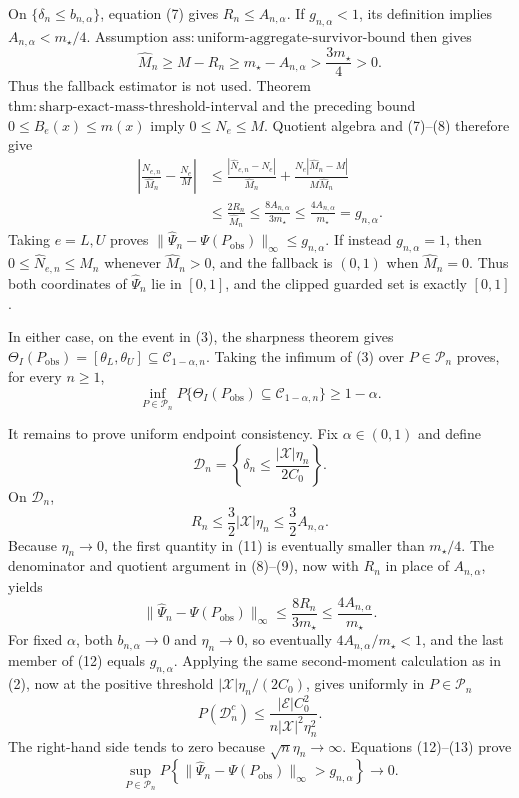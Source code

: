 On \(\{\delta_n\le b_{n,\alpha}\}\), equation (7) gives \(R_n\le A_{n,\alpha}\).  If \(g_{n,\alpha}<1\), its definition implies \(A_{n,\alpha}<m_{\star}/4\).  Assumption \(\mathrm{ass{:}uniform\text{-}aggregate\text{-}survivor\text{-}bound}\) then gives
\[
\widehat M_n\ge M-R_n
\ge m_{\star}-A_{n,\alpha}>\frac{3m_{\star}}4>0.
\tag{8}
\]
Thus the fallback estimator is not used.  Theorem \(\mathrm{thm{:}sharp\text{-}exact\text{-}mass\text{-}threshold\text{-}interval}\) and the preceding bound \(0\le B_e(x)\le m(x)\) imply \(0\le N_e\le M\).  Quotient algebra and (7)--(8) therefore give
\[
\begin{aligned}
\left|\frac{\widehat N_{e,n}}{\widehat M_n}-\frac{N_e}{M}\right|
&\le\frac{|\widehat N_{e,n}-N_e|}{\widehat M_n}
 +\frac{N_e|\widehat M_n-M|}{M\widehat M_n}\\
&\le\frac{2R_n}{\widehat M_n}
\le\frac{8A_{n,\alpha}}{3m_{\star}}
\le\frac{4A_{n,\alpha}}{m_{\star}}
=g_{n,\alpha}.
\end{aligned}
\tag{9}
\]
Taking \(e=L,U\) proves \(\|\widehat\Psi_n-\Psi(P_{\mathrm{obs}})\|_\infty\le g_{n,\alpha}\).  If instead \(g_{n,\alpha}=1\), then \(0\le\widehat N_{e,n}\le\widehat M_n\) whenever \(\widehat M_n>0\), and the fallback is \((0,1)\) when \(\widehat M_n=0\).  Thus both coordinates of \(\widehat\Psi_n\) lie in \([0,1]\), and the clipped guarded set is exactly \([0,1]\).

In either case, on the event in (3), the sharpness theorem gives \(\Theta_I(P_{\mathrm{obs}})=[\theta_L,\theta_U]\subseteq\mathcal C_{1-\alpha,n}\).  Taking the infimum of (3) over \(P\in\mathcal P_n\) proves, for every \(n\ge1\),
\[
\inf_{P\in\mathcal P_n}
P\{\Theta_I(P_{\mathrm{obs}})\subseteq\mathcal C_{1-\alpha,n}\}
\ge1-\alpha.
\tag{10}
\]

It remains to prove uniform endpoint consistency.  Fix \(\alpha\in(0,1)\) and define
\[
\mathcal D_n=\left\{\delta_n\le
\frac{|\mathcal X|\eta_n}{2C_0}\right\}.
\]
On \(\mathcal D_n\),
\[
R_n\le\frac32|\mathcal X|\eta_n
\le\frac32A_{n,\alpha}.
\tag{11}
\]
Because \(\eta_n\to0\), the first quantity in (11) is eventually smaller than \(m_{\star}/4\).  The denominator and quotient argument in (8)--(9), now with \(R_n\) in place of \(A_{n,\alpha}\), yields
\[
\|\widehat\Psi_n-\Psi(P_{\mathrm{obs}})\|_\infty
\le\frac{8R_n}{3m_{\star}}
\le\frac{4A_{n,\alpha}}{m_{\star}}.
\tag{12}
\]
For fixed \(\alpha\), both \(b_{n,\alpha}\to0\) and \(\eta_n\to0\), so eventually \(4A_{n,\alpha}/m_{\star}<1\), and the last member of (12) equals \(g_{n,\alpha}\).  Applying the same second-moment calculation as in (2), now at the positive threshold \(|\mathcal X|\eta_n/(2C_0)\), gives uniformly in \(P\in\mathcal P_n\)
\[
P(\mathcal D_n^c)
\le \frac{|\mathcal E|C_0^2}
{n|\mathcal X|^2\eta_n^2}.
\tag{13}
\]
The right-hand side tends to zero because \(\sqrt n\eta_n\to\infty\).  Equations (12)--(13) prove
\[
\sup_{P\in\mathcal P_n}
P\!\left\{\|\widehat\Psi_n-\Psi(P_{\mathrm{obs}})\|_\infty>g_{n,\alpha}\right\}
\longrightarrow0.
\tag{14}
\]

